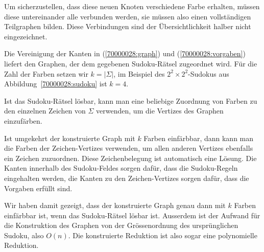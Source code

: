 \begin{loesung}
Um sicherzustellen, dass diese neuen Knoten verschiedene Farbe erhalten,
müssen diese untereinander alle verbunden werden, sie müssen also
einen vollständigen Teilgraphen bilden.
Diese Verbindungen sind der Übersichtlichkeit halber nicht eingezeichnet.

Die Vereinigung der Kanten in (\ref{70000028:graph}) und
(\ref{70000028:vorgaben}) liefert den Graphen, der dem gegebenen
Sudoku-Rätsel zugeordnet wird.
Für die Zahl der Farben setzen wir $k=|\Sigma|$, im Beispiel des
$2^2\times 2^2$-Sudokus aus Abbildung~\ref{70000028:sudoku} ist $k=4$.

Ist das Sudoku-Rätsel lösbar, kann man eine beliebige
Zuordnung von Farben zu den einzelnen Zeichen von $\Sigma$ verwenden,
um die Vertizes des Graphen einzufärben. 

Ist umgekehrt der konstruierte Graph mit $k$ Farben einfärbbar, dann kann man
die Farben der Zeichen-Vertizes verwenden, um allen anderen Vertizes
ebenfalls ein Zeichen zuzuordnen. Diese Zeichenbelegung ist automatisch
eine Lösung. Die Kanten innerhalb des Sudoku-Feldes sorgen dafür, dass
die Sudoku-Regeln eingehalten werden, die Kanten zu den Zeichen-Vertizes
sorgen dafür, dass die Vorgaben erfüllt sind.

Wir haben damit gezeigt, dass der konstruierte Graph genau dann mit
$k$ Farben einfärbbar ist, wenn das Sudoku-Rätsel lösbar ist. 
Ausserdem ist der Aufwand für die Konstruktion des Graphen von der
Grössenordnung des ursprünglichen Sudoku, also $O(n)$. Die konstruierte
Reduktion ist also sogar eine polynomielle Reduktion.
\end{loesung}


